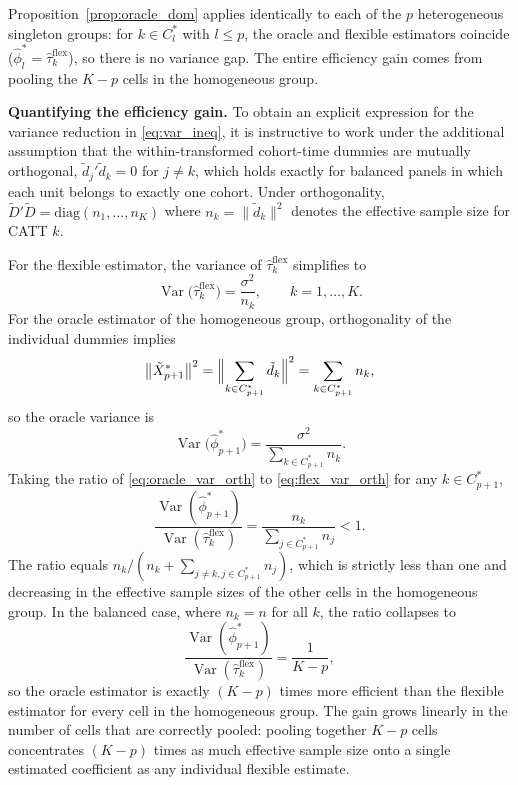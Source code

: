 \documentclass[margin=3in, 12pt]{article}
\DeclareMathOperator{\Var}{Var}
\newcommand{\1}{\mathbbm{1}}
\newcommand{\Dtd}{\tilde{D}}
\begin{document}
\noindent Proposition~\ref{prop:oracle_dom} applies identically to each of
the $p$ heterogeneous singleton groups: for $k \in C_l^*$ with
$l \leq p$, the oracle and flexible estimators coincide ($\hat\phi_l^* =
\hat\tau_k^{\text{flex}}$), so there is no variance gap.
The entire efficiency gain comes from pooling the $K-p$ cells in the
homogeneous group.

\bigskip

\noindent\textbf{Quantifying the efficiency gain.}
To obtain an explicit expression for the variance reduction in
\eqref{eq:var_ineq}, it is instructive to work under the additional
assumption that the within-transformed cohort-time dummies are mutually
orthogonal, $\tilde{d}_j'\tilde{d}_k = 0$ for $j \neq k$, which holds
exactly for balanced panels in which each unit belongs to exactly one
cohort.
Under orthogonality, $\Dtd'\Dtd = \mathrm{diag}(n_1,\ldots,n_K)$ where
$n_k = \|\tilde{d}_k\|^2$ denotes the effective sample size for CATT $k$.

For the flexible estimator, the variance of $\hat\tau_k^{\text{flex}}$ simplifies to
\begin{equation}
  \Var\!\bigl(\hat\tau_k^{\text{flex}}\bigr)
  = \frac{\sigma^2}{n_k},
  \qquad k = 1,\ldots,K.
  \label{eq:flex_var_orth}
\end{equation}
For the oracle estimator of the homogeneous group, orthogonality of the
individual dummies implies
\begin{equation}
  \bigl\|\tilde{X}_{p+1}^*\bigr\|^2
  = \Bigl\|\sum_{k\in C_{p+1}^*}\tilde{d}_k\Bigr\|^2
  = \sum_{k\in C_{p+1}^*} n_k,
  \label{eq:oracle_norm}
\end{equation}
so the oracle variance is
\begin{equation}
  \Var\!\bigl(\hat\phi_{p+1}^*\bigr)
  = \frac{\sigma^2}{\displaystyle\sum_{k\in C_{p+1}^*} n_k}.
  \label{eq:oracle_var_orth}
\end{equation}
Taking the ratio of \eqref{eq:oracle_var_orth} to \eqref{eq:flex_var_orth}
for any $k \in C_{p+1}^*$,
\begin{equation}
  \frac{\Var(\hat\phi_{p+1}^*)}{\Var(\hat\tau_k^{\text{flex}})}
  = \frac{n_k}{\displaystyle\sum_{j\in C_{p+1}^*} n_j}
  < 1.
  \label{eq:var_ratio}
\end{equation}
The ratio equals $n_k / (n_k + \sum_{j \neq k, j \in C_{p+1}^*} n_j)$,
which is strictly less than one and decreasing in the effective sample sizes
of the other cells in the homogeneous group.
In the balanced case, where $n_k = n$ for all $k$, the ratio collapses to
\begin{equation}
  \frac{\Var(\hat\phi_{p+1}^*)}{\Var(\hat\tau_k^{\text{flex}})}
  = \frac{1}{K - p},
  \label{eq:var_ratio_balanced}
\end{equation}
so the oracle estimator is exactly $(K-p)$ times more efficient than the
flexible estimator for every cell in the homogeneous group.
The gain grows linearly in the number of cells that are correctly pooled:
pooling together $K-p$ cells concentrates $(K-p)$ times as much effective
sample size onto a single estimated coefficient as any individual flexible
estimate.
\end{document}
